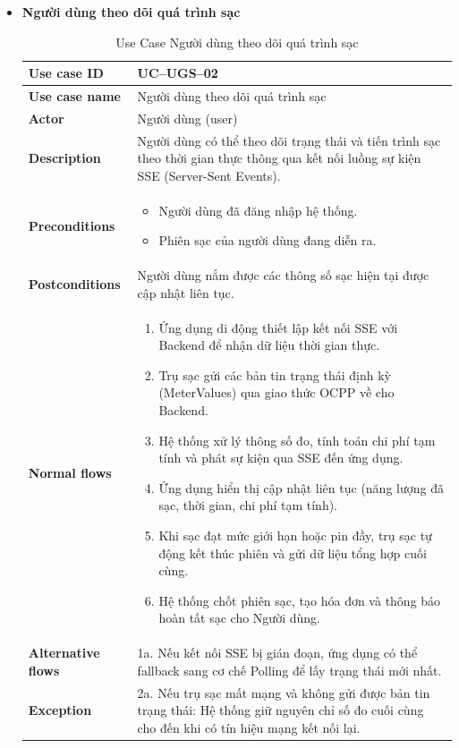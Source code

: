 \begin{itemize}
\item \textbf{Người dùng theo dõi quá trình sạc}
\begin{longtable}{|m{}|m{}|}
          \caption{Use Case Người dùng theo dõi quá trình sạc} \\
  \hline
  \textbf{Use case ID} & UC--UGS--02 \\
  \hline
  \textbf{Use case name} & Người dùng theo dõi quá trình sạc \\
  \hline
  \textbf{Actor} & Người dùng (user) \\
  \hline
  \textbf{Description} & Người dùng có thể theo dõi trạng thái và tiến trình sạc theo thời gian thực thông qua kết nối luồng sự kiện SSE (Server-Sent Events). \\
  \hline
  \textbf{Preconditions} &
  \begin{itemize}
    \item Người dùng đã đăng nhập hệ thống.
    \item Phiên sạc của người dùng đang diễn ra.
  \end{itemize}\\
  \hline
  \textbf{Postconditions} & Người dùng nắm được các thông số sạc hiện tại được cập nhật liên tục. \\
  \hline
  \textbf{Normal flows} &
  \begin{enumerate}[label=\arabic*.]
    \item Ứng dụng di động thiết lập kết nối SSE với Backend để nhận dữ liệu thời gian thực.
    \item Trụ sạc gửi các bản tin trạng thái định kỳ (MeterValues) qua giao thức OCPP về cho Backend.
    \item Hệ thống xử lý thông số đo, tính toán chi phí tạm tính và phát sự kiện qua SSE đến ứng dụng.
    \item Ứng dụng hiển thị cập nhật liên tục (năng lượng đã sạc, thời gian, chi phí tạm tính).
    \item Khi sạc đạt mức giới hạn hoặc pin đầy, trụ sạc tự động kết thúc phiên và gửi dữ liệu tổng hợp cuối cùng.
    \item Hệ thống chốt phiên sạc, tạo hóa đơn và thông báo hoàn tất sạc cho Người dùng.
  \end{enumerate}\\
  \hline
  \textbf{Alternative flows} &
  1a. Nếu kết nối SSE bị gián đoạn, ứng dụng có thể fallback sang cơ chế Polling để lấy trạng thái mới nhất.\\
  \hline
  \textbf{Exception} &
  2a. Nếu trụ sạc mất mạng và không gửi được bản tin trạng thái: Hệ thống giữ nguyên chỉ số đo cuối cùng cho đến khi có tín hiệu mạng kết nối lại.\\
  \hline
  \end{longtable}


\end{itemize}
